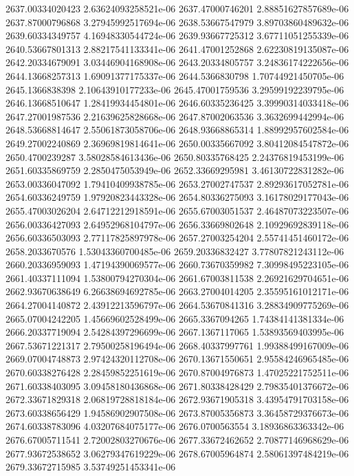 {2637.00334020423 2.63624093258521e-06
2637.47000746201 2.88851627857689e-06
2637.87000796868 3.27945992517694e-06
2638.53667547979 3.89703860489632e-06
2639.60334349757 4.16948330544724e-06
2639.93667725312 3.67711051255339e-06
2640.53667801313 2.88217541133341e-06
2641.47001252868 2.62230819135087e-06
2642.20334679091 3.03446904168908e-06
2643.20334805757 3.24836174222656e-06
2644.13668257313 1.69091377175337e-06
2644.5366830798 1.70744921450705e-06
2645.1366838398 2.10643910177233e-06
2645.47001759536 3.29599192239795e-06
2646.13668510647 1.28419934454801e-06
2646.60335236425 3.39990314033418e-06
2647.27001987536 2.21639625828668e-06
2647.87002063536 3.3632699442994e-06
2648.53668814647 2.55061873058706e-06
2648.93668865314 1.88992957602584e-06
2649.27002240869 2.36969819814641e-06
2650.00335667092 3.80412084547872e-06
2650.4700239287 3.58028584613436e-06
2650.80335768425 2.24376819453199e-06
2651.60335869759 2.2850475053949e-06
2652.33669295981 3.46130722831282e-06
2653.00336047092 1.79410409938785e-06
2653.27002747537 2.89293617052781e-06
2654.60336249759 1.97920823443328e-06
2654.80336275093 3.16178029177043e-06
2655.47003026204 2.64712212918591e-06
2655.67003051537 2.46487073223507e-06
2656.00336427093 2.64952968104797e-06
2656.33669802648 2.10929692839118e-06
2656.60336503093 2.77117825897978e-06
2657.27003254204 2.55741451460172e-06
2658.2033670576 1.53043360700485e-06
2659.20336832427 3.77807821243112e-06
2660.20336959093 1.47194390069577e-06
2660.73670359982 7.30998495223105e-06
2661.40337111094 1.53800794270304e-06
2661.67003811538 2.26921629704651e-06
2662.93670638649 6.26638694692785e-06
2663.27004014205 2.35595161012171e-06
2664.27004140872 2.43912213596797e-06
2664.53670841316 3.28834909775269e-06
2665.07004242205 1.45669602528499e-06
2665.3367094265 1.74384141381334e-06
2666.20337719094 2.54284397296699e-06
2667.1367117065 1.53893569403995e-06
2667.53671221317 2.79500258196494e-06
2668.40337997761 1.99388499167009e-06
2669.07004748873 2.97424320112708e-06
2670.13671550651 2.95584246965485e-06
2670.60338276428 2.28459852251619e-06
2670.87004976873 1.47025221752511e-06
2671.60338403095 3.09458180436868e-06
2671.80338428429 2.79835401376672e-06
2672.33671829318 2.06819728818184e-06
2672.93671905318 3.43954791703158e-06
2673.60338656429 1.94586902907508e-06
2673.87005356873 3.36458729376673e-06
2674.60338783096 4.03207684075177e-06
2676.0700563554 3.18936863363342e-06
2676.67005711541 2.72002803270676e-06
2677.33672462652 2.70877146968629e-06
2677.93672538652 3.06279347619229e-06
2678.67005964874 2.58061397484219e-06
2679.33672715985 3.53749251453341e-06
}
